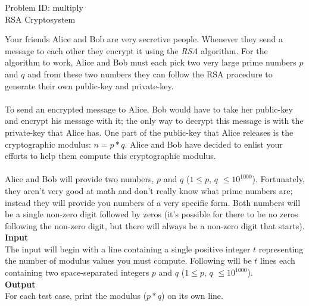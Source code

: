 \documentclass[a4paper,11pt]{article}
\begin{document}
\begin{center}
{\Huge Problem ID: multiply}\vspace{2 mm} \\	%
{\huge RSA Cryptosystem}\vspace{2 mm} \\	%

\setcounter{page}{12}
\end{center}
\large{
Your friends Alice and Bob are very secretive people. Whenever they send a message to each other they encrypt it using the \emph{RSA} algorithm. For the algorithm to work, Alice and Bob must each pick two very large prime numbers $p$ and $q$ and from these two numbers they can follow the RSA procedure to generate their own public-key and private-key.
\\\\
To send an encrypted message to Alice, Bob would have to take her public-key and encrypt his message with it; the only way to decrypt this message is with the private-key that Alice has. One part of the public-key that Alice releases is the cryptographic modulus: $n = p*q$. Alice and Bob have decided to enlist your efforts to help them compute this cryptographic modulus. 
\\\\
Alice and Bob will provide two numbers, $p$ and $q$ ($1 \leq p$, $q$ $\leq 10^{1000}$). Fortunately, they aren't very good at math and don't really know what prime numbers are; instead they will provide you numbers of a very specific form. Both numbers will be a single non-zero digit followed by zeros (it's possible for there to be no zeros following the non-zero digit, but there will always be a non-zero digit that starts).}
\vspace{7mm}\\
\large{\bf{Input}}\vspace{2mm}\\
The input will begin with a line containing a single positive integer $t$ representing the number of modulus values you must compute. Following will be $t$ lines each containing two space-separated integers $p$ and $q$ ($1 \leq p$, $q$ $\leq 10^{1000}$).
\vspace{3mm}\\
\large{\bf{Output}}\vspace{2mm}\\
For each test case, print the modulus ($p*q$) on its own line.
\vspace{5mm}\\
\end{document}
